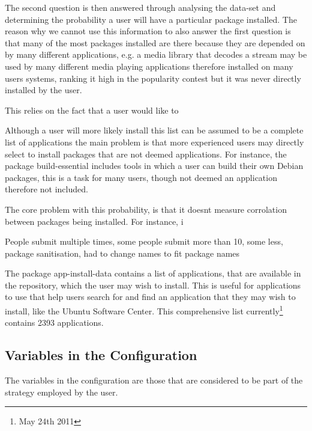 The second question is then answered through analysing the data-set and determining the probability a user will have a particular package installed.
The reason why we cannot use this information to also answer the first question is that many of the most packages installed are there because they are depended on by many different applications,
e.g. a media library that decodes a stream may be used by many different media playing applications therefore installed on many users systems, 
ranking it high in the popularity contest but it was never directly installed by the user.


This relies on the fact that a user would like to 

Although a user will more likely install this list can be assumed to be a complete list of applications 
the main problem is that more experienced users may directly select to install packages that are not deemed applications.
For instance, the package build-essential includes tools in which a user can build their own Debian packages,
this is a task for many users, though not deemed an application therefore not included.

The core problem with this probability, is that it doesnt measure corrolation between packages being installed.
For instance, i

People submit multiple times, some people submit more than 10, some less, package sanitisation, had to change names to fit package names

The package app-install-data contains a list of applications, that are available in the repository, which the user may wish to install.
This is useful for applications to use that help users search for and find an application that they may wish to install, like the Ubuntu Software Center.
This comprehensive list currently\footnote{May 24th 2011} contains 2393 applications.


\subsection{Variables in the Configuration}
The variables in the configuration are those that are considered to be part of the strategy employed by the user.

